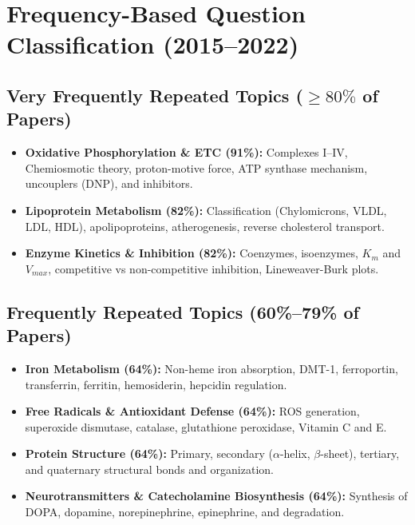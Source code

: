 \documentclass[11pt,a4paper]{article}
\begin{document}
\newpage
\section{Frequency-Based Question Classification (2015--2022)}

\subsection{Very Frequently Repeated Topics ($\ge 80\%$ of Papers)}
\begin{itemize}[leftmargin=*]
    \item \textbf{Oxidative Phosphorylation \& ETC (91\%):} Complexes I--IV, Chemiosmotic theory, proton-motive force, ATP synthase mechanism, uncouplers (DNP), and inhibitors.
    \item \textbf{Lipoprotein Metabolism (82\%):} Classification (Chylomicrons, VLDL, LDL, HDL), apolipoproteins, atherogenesis, reverse cholesterol transport.
    \item \textbf{Enzyme Kinetics \& Inhibition (82\%):} Coenzymes, isoenzymes, $K_m$ and $V_{max}$, competitive vs non-competitive inhibition, Lineweaver-Burk plots.
\end{itemize}

\subsection{Frequently Repeated Topics (60\%--79\% of Papers)}
\begin{itemize}[leftmargin=*]
    \item \textbf{Iron Metabolism (64\%):} Non-heme iron absorption, DMT-1, ferroportin, transferrin, ferritin, hemosiderin, hepcidin regulation.
    \item \textbf{Free Radicals \& Antioxidant Defense (64\%):} ROS generation, superoxide dismutase, catalase, glutathione peroxidase, Vitamin C and E.
    \item \textbf{Protein Structure (64\%):} Primary, secondary ($\alpha$-helix, $\beta$-sheet), tertiary, and quaternary structural bonds and organization.
    \item \textbf{Neurotransmitters \& Catecholamine Biosynthesis (64\%):} Synthesis of DOPA, dopamine, norepinephrine, epinephrine, and degradation.
\end{itemize}
\end{document}
